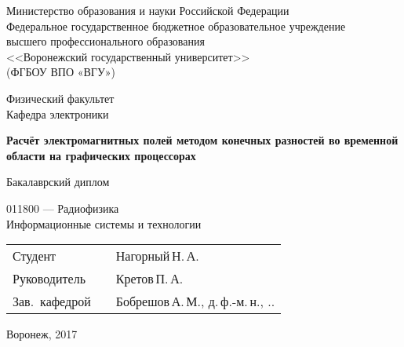 \begin{titlepage}

\centering
Министерство образования и науки Российской Федерации\\
Федеральное государственное бюджетное образовательное учреждение\\
высшего профессионального образования\\
<<Воронежский государственный университет>>\\
(ФГБОУ ВПО «ВГУ»)

\vspace{20mm}

Физический факультет\\
Кафедра электроники

\vspace{35mm}

\textbf{
    Расчёт электромагнитных полей методом конечных разностей во временной области на графических процессорах}

\vspace{15mm}

Бакалаврский диплом\\

\vspace{10mm}

011800 --- Радиофизика\\
Информационные системы и технологии\\

\vspace{20mm}

\begin{tabularx}{\textwidth}{lll}
Студент       & \hspace{35mm} & Нагорный\,Н.\,А.\\
Руководитель  & \hspace{35mm} &  Кретов\,П.\,А.\\
Зав.~кафедрой & \hspace{35mm} & Бобрешов\,А.\,М., д.\,ф.-м.\,н.,
\underline{\hspace{5mm}}.\underline{\hspace{5mm}}.\underline{\hspace{10mm}}\\
\end{tabularx}

\vspace*{\fill}

Воронеж, 2017

\end{titlepage}

\setcounter{page}{2}